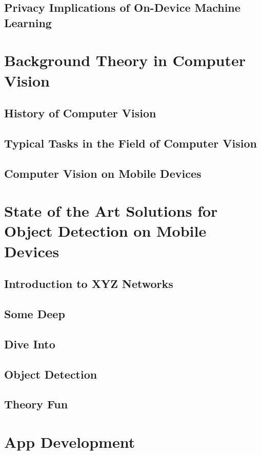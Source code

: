 \documentclass[11pt,
               a4paper,
               bibtotoc,
               idxtotoc,
               headsepline,
               footsepline,
               footexclude,
               BCOR12mm,
               DIV13,
               openany,   %
               ]
               {scrbook}
\begin{document}
\section{Privacy Implications of On-Device Machine Learning}

\chapter{Background Theory in Computer Vision}

\section{History of Computer Vision}

\section{Typical Tasks in the Field of Computer Vision}

\section{Computer Vision on Mobile Devices}

\chapter{State of the Art Solutions for Object Detection on Mobile Devices}

\section{Introduction to XYZ Networks}

\section{Some Deep}
\section{Dive Into}
\section{Object Detection}
\section{Theory Fun}

\chapter{App Development}
\end{document}
